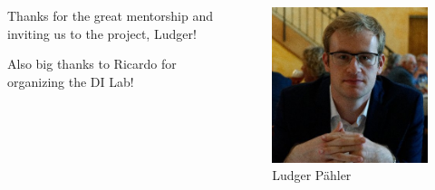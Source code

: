 \begin{frame}
    \begin{columns}
        \begin{column}{.6\textwidth}
            \begin{center}
                \begin{large}
                    Thanks for the great mentorship and inviting us to the project, Ludger!
                \end{large}
                \newline

                Also big thanks to Ricardo for \\ 
                organizing the DI Lab!
            \end{center}
        \end{column}
        \begin{column}{.4\textwidth}
            \begin{figure}
                \includegraphics[scale=.3]{figures/ludger-paehler.jpg}
                \caption*{Ludger Pähler\footnotemark}
            \end{figure}
        \end{column}
    \end{columns}
\end{frame}
